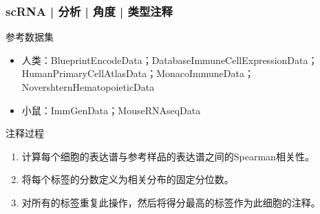 \documentclass[11pt]{ctexbeamer}
\begin{document}
\begin{frame}
	\frametitle{scRNA | 分析 | 角度 | 类型注释}
	\begin{block}{参考数据集}
		\begin{itemize}
			\item 人类：BlueprintEncodeData；DatabaseImmuneCellExpressionData；HumanPrimaryCellAtlasData；MonacoImmuneData；NovershternHematopoieticData
			\item 小鼠：ImmGenData；MouseRNAseqData
		\end{itemize}
    \end{block}
	\begin{block}{注释过程}
		\begin{enumerate}
			\item 计算每个细胞的表达谱与参考样品的表达谱之间的Spearman相关性。
			\item 将每个标签的分数定义为相关分布的固定分位数。
			\item 对所有的标签重复此操作，然后将得分最高的标签作为此细胞的注释。
		\end{enumerate}
    \end{block}
\end{frame}
\end{document}
